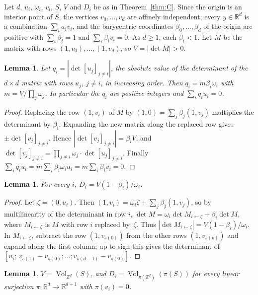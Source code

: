 \documentclass[11pt]{article}
\newtheorem{lemma}[theorem]{Lemma}
\theoremstyle{definition}
\theoremstyle{remark}
\newcommand{\R}{\mathbb R}
\newcommand{\Z}{\mathbb Z}
\newcommand{\Vol}{\operatorname{Vol}}
\begin{document}
Let $d$, $u_i$, $\omega_i$, $v_i$, $S$, $V$ and $D_i$ be as in
Theorem~\ref{thm:C}. Since the origin is an interior point of $S$, the
vertices $v_0,\dots,v_d$ are affinely independent, every $y\in\R^d$ is a
combination $\sum_ia_iv_i$, and the barycentric coordinates
$\beta_0,\dots,\beta_d$ of the origin are positive with $\sum_i\beta_i=1$ and
$\sum_i\beta_iv_i=0$. As $d\ge1$, each $\beta_i<1$. Let $M$ be the matrix with
rows $(1,v_0),\dots,(1,v_d)$, so $V=|\det M|>0$.

\begin{lemma}\label{lem:freq}
Let $q_i=|\det[u_j]_{j\ne i}|$, the absolute value of the determinant of the
$d\times d$ matrix with rows $u_j$, $j\ne i$, in increasing order. Then
$q_i=m\beta_i\omega_i$ with $m=V/\prod_j\omega_j$. In particular the $q_i$ are
positive integers and $\sum_iq_iu_i=0$.
\end{lemma}

\begin{proof}
Replacing the row $(1,v_i)$ of $M$ by $(1,0)=\sum_j\beta_j(1,v_j)$ multiplies
the determinant by $\beta_i$. Expanding the new matrix along the replaced row
gives $\pm\det[v_j]_{j\ne i}$. Hence
$|\det[v_j]_{j\ne i}|=\beta_iV$, and
$\det[v_j]_{j\ne i}=\prod_{j\ne i}\omega_j\cdot\det[u_j]_{j\ne i}$. Finally
$\sum_iq_iu_i=m\sum_i\beta_i\omega_iu_i=m\sum_i\beta_iv_i=0$.
\end{proof}

\begin{lemma}\label{lem:proj}
For every $i$, $D_i=V(1-\beta_i)/\omega_i$.
\end{lemma}

\begin{proof}
Let $\zeta=(0,u_i)$. Then $(1,v_i)=\omega_i\zeta+\sum_j\beta_j(1,v_j)$, so by
multilinearity of the determinant in row $i$,
$\det M=\omega_i\det M_{i\leftarrow\zeta}+\beta_i\det M$, where
$M_{i\leftarrow\zeta}$ is $M$ with row $i$ replaced by~$\zeta$. Thus
$|\det M_{i\leftarrow\zeta}|=V(1-\beta_i)/\omega_i$. In
$M_{i\leftarrow\zeta}$, subtract the row $(1,v_{s(0)})$ from the other rows
$(1,v_{s(k)})$ and expand along the first column; up to sign this gives the
determinant of $[u_i;\,v_{s(1)}-v_{s(0)};\dots;v_{s(d-1)}-v_{s(0)}]$.
\end{proof}

\begin{lemma}\label{lem:vol}
$V=\Vol_{\Z^d}(S)$, and $D_i=\Vol_{\pi(\Z^d)}(\pi(S))$ for every linear
surjection $\pi\colon\R^d\to\R^{d-1}$ with $\pi(v_i)=0$.
\end{lemma}
\end{document}
